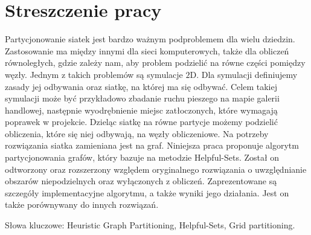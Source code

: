\section{Streszczenie pracy}
Partycjonowanie siatek jest bardzo ważnym podproblemem dla wielu dziedzin.
Zastosowanie ma między innymi dla sieci komputerowych, także dla obliczeń równoległych, gdzie zależy nam,
aby problem podzielić na równe części pomiędzy węzły.
Jednym z takich problemów są symulacje $2$D.
Dla symulacji definiujemy zasady jej odbywania oraz siatkę, na której ma się odbywać.
Celem takiej symulacji może być przykładowo zbadanie ruchu pieszego na mapie galerii handlowej, następnie wyodrębnienie miejsc
zatłoczonych, które wymagają poprawek w projekcie.
Dzieląc siatkę na równe partycje możemy podzielić obliczenia, które się niej odbywają, na węzły obliczeniowe.
Na potrzeby rozwiązania siatka zamieniana jest na graf.
Niniejsza praca proponuje algorytm partycjonowania grafów, który bazuje na metodzie Helpful-Sets.
Został on odtworzony oraz rozszerzony względem oryginalnego rozwiązania o uwzględnianie obszarów niepodzielnych
oraz wyłączonych z obliczeń.
Zaprezentowane są szczegóły implementacyjne algorytmu, a także wyniki jego działania.
Jest on także porównywany do innych rozwiązań.

\newline
\vspace{10mm}

Słowa kluczowe: Heuristic Graph Partitioning, Helpful-Sets, Grid partitioning.